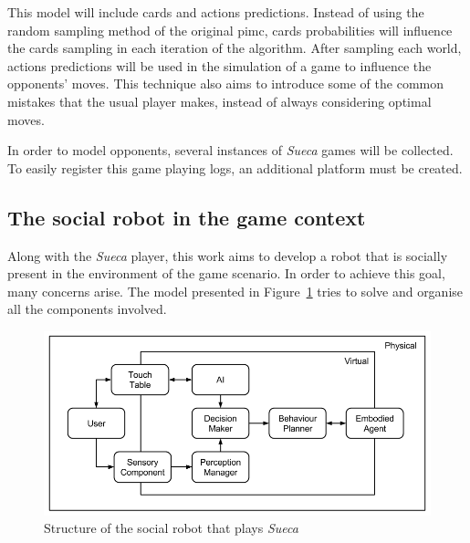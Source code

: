 This model will include cards and actions predictions.
Instead of using the random sampling method of the original \gls{pimc}, cards probabilities will influence the cards sampling in each iteration of the algorithm.
After sampling each world, actions predictions will be used in the simulation of a game to influence the opponents' moves.
This technique also aims to introduce some of the common mistakes that the usual player makes, instead of always considering optimal moves.


In order to model opponents, several instances of \emph{Sueca} games will be collected.
To easily register this game playing logs, an additional platform must be created.


\subsection{The social robot in the game context}
\label{sec:social_solution}

Along with the \emph{Sueca} player, this work aims to develop a robot that is socially present in the environment of the game scenario.
In order to achieve this goal, many concerns arise.
T\textit{}he model presented in Figure~\ref{fig:model} tries to solve and organise all the components involved.

\begin{figure}[ht]
  \centering
    \includegraphics[width=1\textwidth]{./img/model}
  \caption{Structure of the social robot that plays \emph{Sueca}}
\label{fig:model}
\end{figure}

